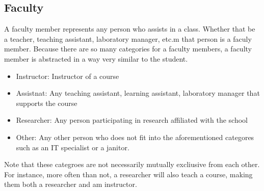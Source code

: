 \documentclass{article}
\begin{document}
  \subsection{Faculty}\label{sec:Courses:Faculty}
    A faculty member represents any person who assists in a class.   Whether that be a teacher, teaching assistant, laboratory manager, etc.m that person is a faculy member.  Because there are so many categories for a faculty members, a faculty member is abstracted in a way very similar to the student.
    \begin{itemize}
      \item Instructor: Instructor of a course
      \item Assistnat: Any teaching assistant, learning assistant, laboratory manager that supports the course
      \item Researcher: Any person participating in research affiliated with the school
      \item Other: Any other person who does not fit into the aforementioned categores such as an IT specialist or a janitor.
    \end{itemize}

    Note that these categroes are not necessarily mutually excliusive from each other.  For instance, more often than not, a researcher will also teach a course, making them both a researcher and am instructor.
\end{document}

